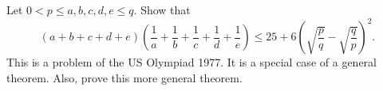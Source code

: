 Let $0 < p \leq a, b, c, d, e \leq q$. Show that
\[ (a + b + c + d + e)\left(\frac{1}{a} + \frac{1}{b} + \frac{1}{c} + \frac{1}{d} + \frac{1}{e}\right) \leq 25 + 6\left(\sqrt{\frac{p}{q}} - \sqrt{\frac{q}{p}}\right)^2. \]
This is a problem of the US Olympiad 1977. It is a special case of a general theorem. Also, prove this more general theorem.

